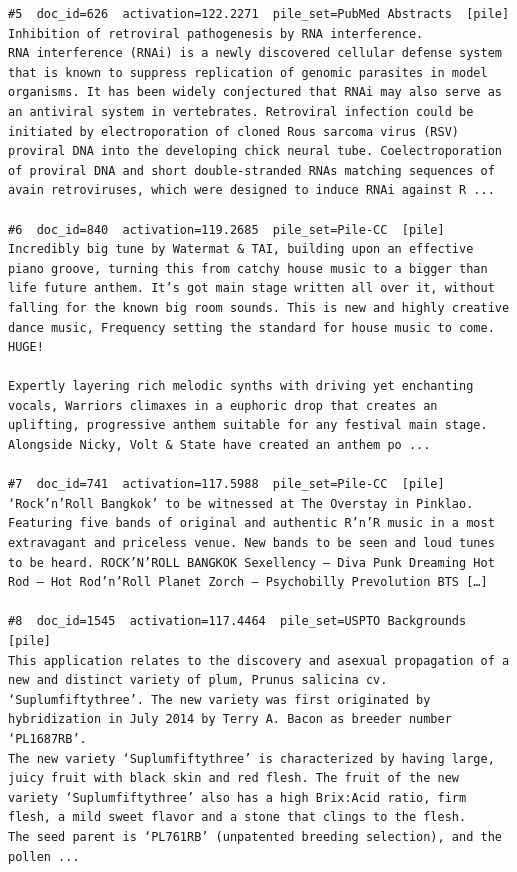 \begin{verbatim}
#5  doc_id=626  activation=122.2271  pile_set=PubMed Abstracts  [pile]
Inhibition of retroviral pathogenesis by RNA interference.
RNA interference (RNAi) is a newly discovered cellular defense system that is known to suppress replication of genomic parasites in model organisms. It has been widely conjectured that RNAi may also serve as an antiviral system in vertebrates. Retroviral infection could be initiated by electroporation of cloned Rous sarcoma virus (RSV) proviral DNA into the developing chick neural tube. Coelectroporation of proviral DNA and short double-stranded RNAs matching sequences of avain retroviruses, which were designed to induce RNAi against R ...

#6  doc_id=840  activation=119.2685  pile_set=Pile-CC  [pile]
Incredibly big tune by Watermat & TAI, building upon an effective piano groove, turning this from catchy house music to a bigger than life future anthem. It’s got main stage written all over it, without falling for the known big room sounds. This is new and highly creative dance music, Frequency setting the standard for house music to come. HUGE!

Expertly layering rich melodic synths with driving yet enchanting vocals, Warriors climaxes in a euphoric drop that creates an uplifting, progressive anthem suitable for any festival main stage. Alongside Nicky, Volt & State have created an anthem po ...

#7  doc_id=741  activation=117.5988  pile_set=Pile-CC  [pile]
‘Rock’n’Roll Bangkok’ to be witnessed at The Overstay in Pinklao. Featuring five bands of original and authentic R’n’R music in a most extravagant and priceless venue. New bands to be seen and loud tunes to be heard. ROCK’N’ROLL BANGKOK Sexellency – Diva Punk Dreaming Hot Rod – Hot Rod’n’Roll Planet Zorch – Psychobilly Prevolution BTS […]

#8  doc_id=1545  activation=117.4464  pile_set=USPTO Backgrounds  [pile]
This application relates to the discovery and asexual propagation of a new and distinct variety of plum, Prunus salicina cv. ‘Suplumfiftythree’. The new variety was first originated by hybridization in July 2014 by Terry A. Bacon as breeder number ‘PL1687RB’.
The new variety ‘Suplumfiftythree’ is characterized by having large, juicy fruit with black skin and red flesh. The fruit of the new variety ‘Suplumfiftythree’ also has a high Brix:Acid ratio, firm flesh, a mild sweet flavor and a stone that clings to the flesh.
The seed parent is ‘PL761RB’ (unpatented breeding selection), and the pollen ...


\end{verbatim}
